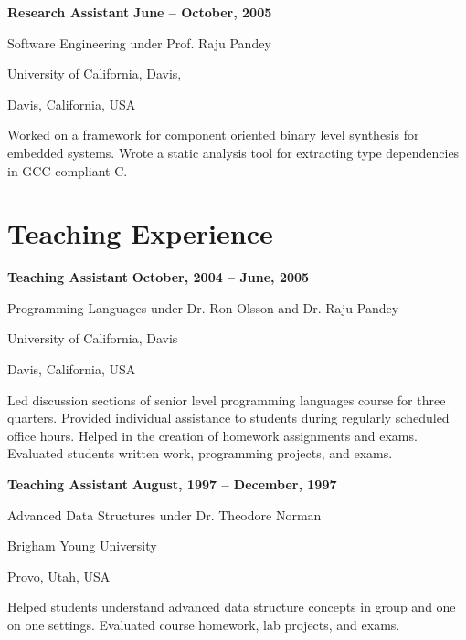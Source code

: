 \documentclass[margin,line,article]{res}
\newenvironment{list1}{
  \begin{list}{}{%
      \setlength{\itemsep}{0in}
      \setlength{\parsep}{0in} \setlength{\parskip}{0in}
      \setlength{\topsep}{0in} \setlength{\partopsep}{0in} 
      \setlength{\leftmargin}{0.17in}}}{\end{list}}
\begin{document}
\begin{resume}
\textbf{Research Assistant} \hfill \textbf{June -- October, 2005}\\
\vspace{-10pt}
\begin{list1}
\item Software Engineering under Prof. Raju Pandey
\item University of California, Davis,
\item Davis, California, USA
\vspace{6pt}
\item Worked on a framework for component oriented binary level synthesis for embedded 
systems. Wrote a static analysis tool for extracting type dependencies in GCC compliant 
C. 
\end{list1}

\section{Teaching Experience}
\textbf{Teaching Assistant} \hfill \textbf{October, 2004 -- June, 2005}\\
\vspace{-10pt}
\begin{list1}
\item Programming Languages under Dr. Ron Olsson and Dr. Raju Pandey
\item University of California, Davis
\item Davis, California, USA
\vspace{6pt}
\item Led discussion sections of senior level programming languages course for three quarters.
Provided individual assistance to students during regularly scheduled office hours. 
Helped in the creation of homework assignments and exams. Evaluated students written 
work, programming projects, and exams. 
\end{list1}

\textbf{Teaching Assistant} \hfill \textbf{August, 1997 -- December, 1997}\\
\vspace{-10pt}
\begin{list1}
\item Advanced Data Structures under Dr. Theodore Norman
\item Brigham Young University
\item Provo, Utah, USA
\vspace{6pt}
\item Helped students understand advanced data structure concepts in group and one on one 
settings. Evaluated course homework, lab projects, and exams. 
\end{list1}




\end{resume}
\end{document}
